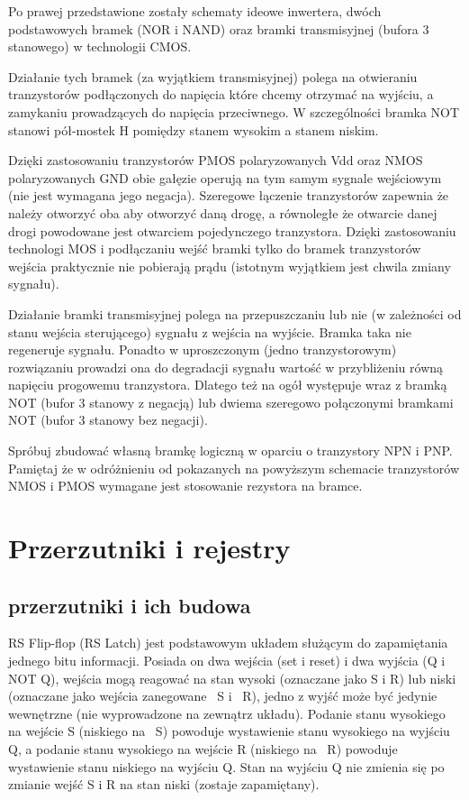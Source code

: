 \documentclass{pdfBooklets}
\begin{document}
Po prawej przedstawione zostały schematy ideowe inwertera, dwóch podstawowych bramek (NOR i NAND) oraz bramki transmisyjnej (bufora 3 stanowego) w technologii CMOS.

Działanie tych bramek (za wyjątkiem transmisyjnej) polega na otwieraniu tranzystorów podłączonych do napięcia które chcemy otrzymać na wyjściu, a zamykaniu prowadzących do napięcia przeciwnego. W szczególności bramka NOT stanowi pół-mostek H pomiędzy stanem wysokim a stanem niskim.

Dzięki zastosowaniu tranzystorów PMOS polaryzowanych Vdd oraz NMOS polaryzowanych GND obie gałęzie operują na tym samym sygnale wejściowym (nie jest wymagana jego negacja). Szeregowe łączenie tranzystorów zapewnia że należy otworzyć oba aby otworzyć daną drogę, a równoległe że otwarcie danej drogi powodowane jest otwarciem pojedynczego tranzystora. Dzięki zastosowaniu technologi MOS i podłączaniu wejść bramki tylko do bramek tranzystorów wejścia praktycznie nie pobierają prądu (istotnym wyjątkiem jest chwila zmiany sygnału).

Działanie bramki transmisyjnej polega na przepuszczaniu lub nie (w zależności od stanu wejścia sterującego) sygnału z wejścia na wyjście. Bramka taka nie regeneruje sygnału. Ponadto w uproszczonym (jedno tranzystorowym) rozwiązaniu prowadzi ona do degradacji sygnału wartość w przybliżeniu równą napięciu progowemu tranzystora. Dlatego też na ogół występuje wraz z bramką NOT (bufor 3 stanowy z negacją) lub dwiema szeregowo połączonymi bramkami NOT (bufor 3 stanowy bez negacji).

\begin{Zadanie}{}{}
Spróbuj zbudować własną bramkę logiczną w oparciu o tranzystory NPN i PNP. Pamiętaj że w odróżnieniu od pokazanych na powyższym schemacie tranzystorów NMOS i PMOS wymagane jest stosowanie rezystora na bramce.
\end{Zadanie}

\section{Przerzutniki i rejestry}
\subsection{przerzutniki i ich budowa}

RS Flip-flop (RS Latch) jest podstawowym układem służącym do zapamiętania jednego bitu informacji. Posiada on dwa wejścia (set i reset) i dwa wyjścia (Q i NOT Q), wejścia mogą reagować na stan wysoki (oznaczane jako S i R) lub niski (oznaczane jako wejścia zanegowane ~S i ~R), jedno z wyjść może być jedynie wewnętrzne (nie wyprowadzone na zewnątrz układu). Podanie stanu wysokiego na wejście S (niskiego na ~S) powoduje wystawienie stanu wysokiego na wyjściu Q, a podanie stanu wysokiego na wejście R (niskiego na ~R) powoduje wystawienie stanu niskiego na wyjściu Q. Stan na wyjściu Q nie zmienia się po zmianie wejść S i R na stan niski (zostaje zapamiętany).
\end{document}
